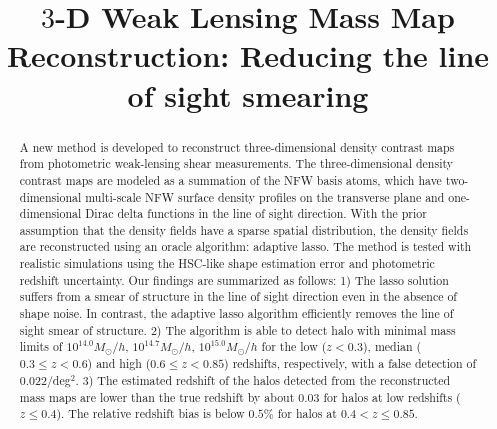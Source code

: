 \documentclass[twocolumn]{aastex63}
\begin{document}
\title{$3$-D Weak Lensing Mass Map Reconstruction:
Reducing the line of sight smearing}

\begin{abstract}
A new method is developed to reconstruct three-dimensional density contrast
maps from photometric weak-lensing shear measurements. The three-dimensional
density contrast maps are modeled as a summation of the NFW basis atoms, which
have two-dimensional multi-scale NFW surface density profiles on the transverse
plane and one-dimensional Dirac delta functions in the line of sight direction.
With the prior assumption that the density fields have a sparse spatial
distribution, the density fields are reconstructed using an oracle algorithm:
adaptive lasso. The method is tested with realistic simulations using the
HSC-like shape estimation error and photometric redshift uncertainty.  Our
findings are summarized as follows: 1) The lasso solution suffers from a smear
of structure in the line of sight direction even in the absence of shape noise.
In contrast, the adaptive lasso algorithm efficiently removes the line of sight
smear of structure.  2) The algorithm is able to detect halo with minimal mass
limits of $10^{14.0} M_{\odot}/h$, $10^{14.7} M_{\odot}/h$, $10^{15.0}
M_{\odot}/h$ for the low ($z<0.3$), median ($0.3\leq z< 0.6$) and high
($0.6\leq z< 0.85$) redshifts, respectively, with a false detection of
0.022/deg$^2$.  3) The estimated redshift of the halos detected from the
reconstructed mass maps are lower than the true redshift by about $0.03$ for
halos at low redshifts ($z\leq 0.4$). The relative redshift bias is below
$0.5\%$ for halos at $0.4<z\leq 0.85$.
\end{abstract}
\end{document}
